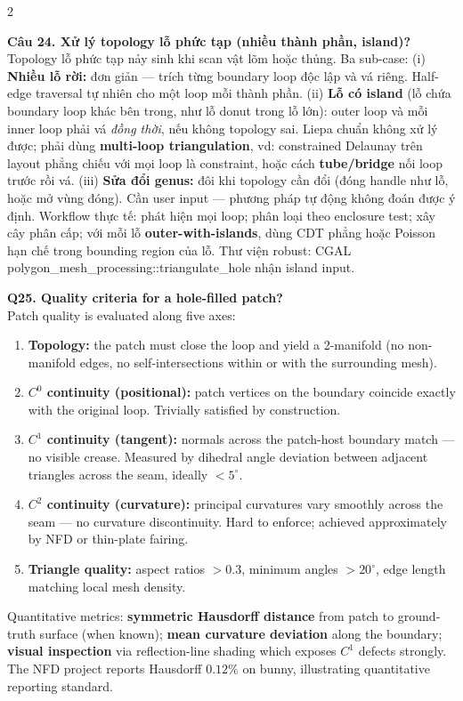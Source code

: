 \begin{paracol}{2}
\switchcolumn

\textbf{Câu 24. Xử lý topology lỗ phức tạp (nhiều thành phần, island)?}\\
Topology lỗ phức tạp nảy sinh khi scan vật lõm hoặc thủng. Ba sub-case: (i) \textbf{Nhiều lỗ rời:} đơn giản — trích từng boundary loop độc lập và vá riêng. Half-edge traversal tự nhiên cho một loop mỗi thành phần. (ii) \textbf{Lỗ có island} (lỗ chứa boundary loop khác bên trong, như lỗ donut trong lỗ lớn): outer loop và mỗi inner loop phải vá \emph{đồng thời}, nếu không topology sai. Liepa chuẩn không xử lý được; phải dùng \textbf{multi-loop triangulation}, vd: constrained Delaunay trên layout phẳng chiếu với mọi loop là constraint, hoặc cách \textbf{tube/bridge} nối loop trước rồi vá. (iii) \textbf{Sửa đổi genus:} đôi khi topology cần đổi (đóng handle như lỗ, hoặc mở vùng đóng). Cần user input — phương pháp tự động không đoán được ý định. Workflow thực tế: phát hiện mọi loop; phân loại theo enclosure test; xây cây phân cấp; với mỗi lỗ \textbf{outer-with-islands}, dùng CDT phẳng hoặc Poisson hạn chế trong bounding region của lỗ. Thư viện robust: CGAL polygon\_mesh\_processing::triangulate\_hole nhận island input.

\switchcolumn*

\textbf{Q25. Quality criteria for a hole-filled patch?}\\
Patch quality is evaluated along five axes:
\begin{enumerate}[leftmargin=*,nosep]
\item \textbf{Topology:} the patch must close the loop and yield a 2-manifold (no non-manifold edges, no self-intersections within or with the surrounding mesh).
\item \textbf{$C^0$ continuity (positional):} patch vertices on the boundary coincide exactly with the original loop. Trivially satisfied by construction.
\item \textbf{$C^1$ continuity (tangent):} normals across the patch-host boundary match — no visible crease. Measured by dihedral angle deviation between adjacent triangles across the seam, ideally $< 5^\circ$.
\item \textbf{$C^2$ continuity (curvature):} principal curvatures vary smoothly across the seam — no curvature discontinuity. Hard to enforce; achieved approximately by NFD or thin-plate fairing.
\item \textbf{Triangle quality:} aspect ratios $> 0.3$, minimum angles $> 20^\circ$, edge length matching local mesh density.
\end{enumerate}
Quantitative metrics: \textbf{symmetric Hausdorff distance} from patch to ground-truth surface (when known); \textbf{mean curvature deviation} along the boundary; \textbf{visual inspection} via reflection-line shading which exposes $C^1$ defects strongly. The NFD project reports Hausdorff $0.12\%$ on bunny, illustrating quantitative reporting standard.


\end{paracol}
